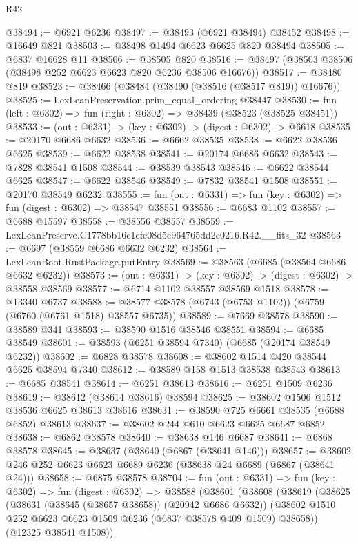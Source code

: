 \begin{lexlean}{R42}
\begin{coremodule}
{@38494 := @6921 @6236
@38497 := @38493 (@6921 @38494) @38452
@38498 := @16649 @821
@38503 := @38498 @1494 @6623 @6625 @820 @38494
@38505 := @6837 @16628 @11
@38506 := @38505 @820
@38516 := @38497 (@38503 @38506 (@38498 @252 @6623 @6623 @820 @6236 @38506 @16676))
@38517 := @38480 @819
@38523 := @38466 (@38484 (@38490 (@38516 (@38517 @819)) @16676))
@38525 := LexLeanPreservation.prim_equal_ordering @38447
@38530 := fun (left : @6302) => fun (right : @6302) => @38439 (@38523 (@38525 @38451))
@38533 := (out : @6331) -> (key : @6302) -> (digest : @6302) -> @6618
@38535 := @20170 @6686 @6632
@38536 := @6662 @38535
@38538 := @6622 @38536 @6625
@38539 := @6622 @38538
@38541 := @20174 @6686 @6632
@38543 := @7828 @38541 @1508
@38544 := @38539 @38543
@38546 := @6622 @38544 @6625
@38547 := @6622 @38546
@38549 := @7832 @38541 @1508
@38551 := @20170 @38549 @6232
@38555 := fun (out : @6331) => fun (key : @6302) => fun (digest : @6302) => @38547 @38551
@38556 := @6683 @1102
@38557 := @6688 @15597
@38558 := @38556 @38557
@38559 := LexLeanPreserve.C1778bb16c1cfe08d5e964765dd2c0216.R42.__fits_32
@38563 := @6697 (@38559 @6686 @6632 @6232)
@38564 := LexLeanBoot.RustPackage.putEntry
@38569 := @38563 (@6685 (@38564 @6686 @6632 @6232))
@38573 := (out : @6331) -> (key : @6302) -> (digest : @6302) -> @38558 @38569
@38577 := @6714 @1102 @38557 @38569 @1518
@38578 := @13340 @6737
@38588 := @38577 @38578 (@6743 (@6753 @1102)) (@6759 (@6760 (@6761 @1518) @38557 @6735))
@38589 := @7669 @38578
@38590 := @38589 @341
@38593 := @38590 @1516 @38546 @38551
@38594 := @6685 @38549
@38601 := @38593 (@6251 @38594 @7340) (@6685 (@20174 @38549 @6232))
@38602 := @6828 @38578
@38608 := @38602 @1514 @420 @38544 @6625 @38594 @7340
@38612 := @38589 @158 @1513 @38538 @38543
@38613 := @6685 @38541
@38614 := @6251 @38613
@38616 := @6251 @1509 @6236
@38619 := @38612 (@38614 @38616) @38594
@38625 := @38602 @1506 @1512 @38536 @6625 @38613 @38616
@38631 := @38590 @725 @6661 @38535 (@6688 @6852) @38613
@38637 := @38602 @244 @610 @6623 @6625 @6687 @6852
@38638 := @6862 @38578
@38640 := @38638 @146 @6687
@38641 := @6868 @38578
@38645 := @38637 (@38640 (@6867 (@38641 @146)))
@38657 := @38602 @246 @252 @6623 @6623 @6689 @6236 (@38638 @24 @6689 (@6867 (@38641 @24)))
@38658 := @6875 @38578
@38704 := fun (out : @6331) =>
  fun (key : @6302) =>
  fun (digest : @6302) =>
  @38588
    (@38601
      (@38608
        (@38619
          (@38625
            (@38631 (@38645 (@38657 @38658)) (@20942 @6686 @6632))
            (@38602 @1510 @252 @6623 @6623 @1509 @6236 (@6837 @38578 @409 @1509) @38658))
          (@12325 @38541 @1508))
}
\end{coremodule}
\end{lexlean}
